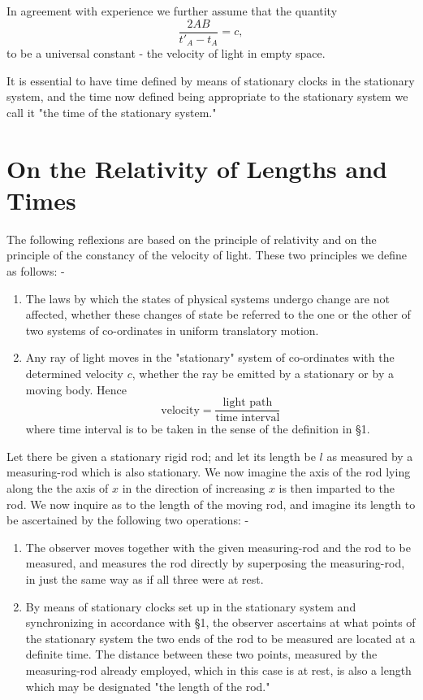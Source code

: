 In agreement with experience we further assume that the quantity
$$ \frac{2AB}{t'_A - t_A} = c ,$$
to be a universal constant - the velocity of light in empty space.

It is essential to have time defined by means of stationary clocks in the stationary system, and the time now defined being appropriate to the stationary system we call it "the time of the stationary system."


\section{On the Relativity of Lengths and Times}
The following reflexions are based on the principle of relativity and on the principle of the constancy of the velocity of light. These two principles we define as follows: -
\begin{enumerate}%
	\item The laws by which the states of physical systems undergo change are not affected, whether these changes of state be referred to the one or the other of two systems of co-ordinates in uniform translatory motion.
	\item Any ray of light moves in the "stationary" system of co-ordinates with the determined velocity $c$, whether the ray be emitted by a stationary or by a moving body. Hence $$\text{velocity} = \frac{\text{light path}}{\text{time interval}}$$ where time interval is to be taken in the sense of the definition in \S 1.
\end{enumerate}

Let there be given a stationary rigid rod; and let its length be $l$ as measured by a measuring-rod which is also stationary. We now imagine the axis of the rod lying along the the axis of $x$ in the direction of increasing $x$ is then imparted to the rod. We now inquire as to the length of the moving rod, and imagine its length to be ascertained by the following two operations: -
\begin{enumerate}[label=(\alph*).]
	\item The observer moves together with the given measuring-rod and the rod to be measured, and measures the rod directly by superposing the measuring-rod, in just the same way as if all three were at rest. \label{item:measurement1}
	\item By means of stationary clocks set up in the stationary system and synchronizing in accordance with \S 1, the observer ascertains at what points of the stationary system the two ends of the rod to be measured are located at a definite time. The distance between these two points, measured by the measuring-rod already employed, which in this case is at rest, is also a length which may be designated "the length of the rod." \label{item:measurement2}
\end{enumerate}

